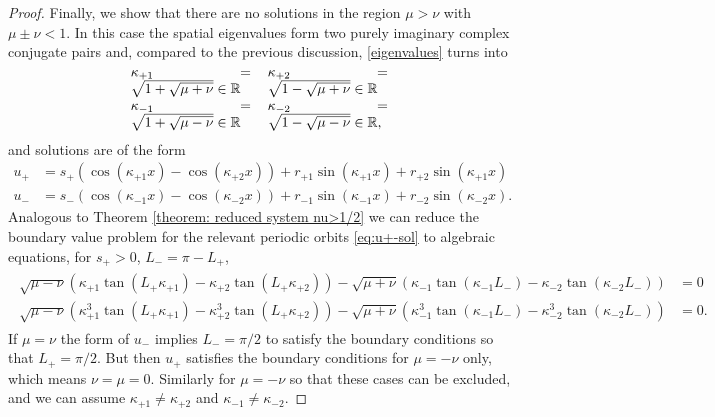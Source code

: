 \documentclass{article}
\numberwithin{equation}{section}
\def\R{\mathbb{R}}
\begin{document}
\begin{proof}
		 	\medskip
		 	Finally, we show that there are no solutions in the region $\mu>\nu$ with $\mu\pm\nu<1$. 
		 	In this case the spatial eigenvalues form two purely imaginary complex conjugate pairs and, compared to the previous discussion,  \eqref{eigenvalues} turns into
		 	\begin{equation}\label{eigenvalues2}
		 		\begin{tabular}{p{0.25\linewidth} p{0.25\linewidth}}
		 			\parbox{\linewidth}{$\kappa_{+1} = \sqrt{1 + \sqrt{\mu + \nu}}\in\R$ \\ $\kappa_{-1} = \sqrt{1 +  \sqrt{\mu - \nu}}\in\R$}&
		 			\parbox{\linewidth}{$\kappa_{+2} = \sqrt{1 - \sqrt{\mu + \nu}}\in\R$ \\ $\kappa_{-2} = \sqrt{1 - \sqrt{\mu - \nu}}\in\R$,}	
		 		\end{tabular}
		 	\end{equation} 
		 	and solutions are of the form 
		 	\begin{align*}
		 		u_+ &= s_+ \left(\cos(\kappa_{+1} x)-\cos(\kappa_{+2} x) \right) +  r_{+1}\sin(\kappa_{+1} x) + 
		 		r_{+2}\sin(\kappa_{+1} x)\\
		 		u_- &= s_-\left(\cos(\kappa_{-1} x)-\cos(\kappa_{-2} x)\right) + r_{-1}\sin(\kappa_{-1} x) + r_{-2}\sin(\kappa_{-2} x).
		 	\end{align*}
		 	Analogous to Theorem \ref{theorem: reduced system nu>1/2} we can reduce the boundary value problem for the relevant periodic orbits \eqref{eq:u+-sol}  to algebraic equations, for $s_+> 0$, $L_-=\pi - L_+$,
		 	\begin{align}\label{eq:reduction2}
		 		\begin{split}
		 			\sqrt{\mu-\nu} \left(\kappa_{+1} \tan(L_+ \kappa_{+1}) - \kappa_{+2} \tan(L_+ \kappa_{+2})\right) 
		 			- \sqrt{\mu+\nu} \left(\kappa_{-1} \tan(\kappa_{-1} L_-) - \kappa_{-2} \tan(\kappa_{-2} L_-)\right)&=0\\			
		 			\sqrt{\mu-\nu} \left(\kappa_{+1}^3 \tan(L_+ \kappa_{+1}) - \kappa_{+2}^3 \tan(L_+ \kappa_{+2})\right) 
		 			- \sqrt{\mu+\nu} \left(\kappa_{-1}^3 \tan(\kappa_{-1} L_-) - \kappa_{-2}^3 \tan(\kappa_{-2} L_-)\right)&=0.
		 	\end{split}\end{align}
		 	If $\mu=\nu$ the form of $u_-$ implies $L_-=\pi/2$ to satisfy the boundary conditions so that $L_+=\pi/2$. But then $u_+$ satisfies the boundary conditions for $\mu=-\nu$ only, which means $\nu=\mu=0$. Similarly for $\mu=-\nu$ so that these cases can be excluded, and we can assume $\kappa_{+1}\neq \kappa_{+2}$ and $\kappa_{-1}\neq \kappa_{-2}$.
		 	

\end{proof}
\end{document}
